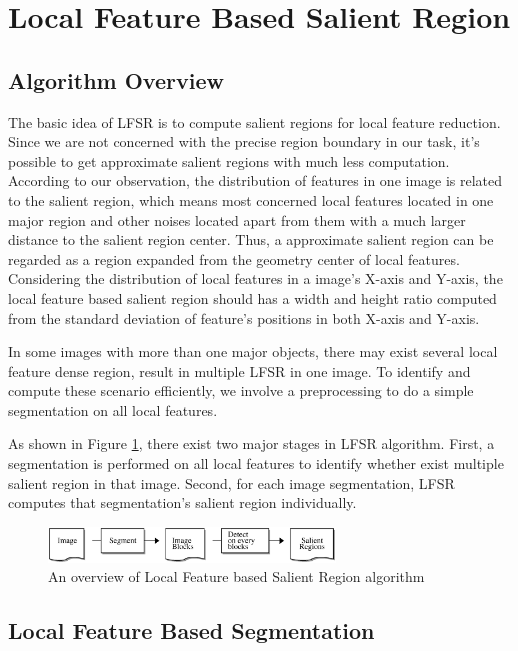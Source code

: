 \section{Local Feature Based Salient Region}
\label{sec:algorithm}

\subsection{Algorithm Overview}
\label{sec:algorithm_overview}

The basic idea of LFSR is to compute salient regions for local feature reduction. Since we are not concerned with the precise region boundary in our task, it's possible to get approximate salient regions with much less computation. According to our observation, the distribution of features in one image is related to the salient region, which means most concerned local features located in one major region and other noises located apart from them with a much larger distance to the salient region center. Thus, a approximate salient region can be regarded as a region expanded from the geometry center of local features. Considering the distribution of local features in a image's X-axis and Y-axis, the local feature based salient region should has a width and height ratio computed from the standard deviation of feature's positions in both X-axis and Y-axis.

In some images with more than one major objects, there may exist several local feature dense region, result in multiple LFSR in one image. To identify and compute these scenario efficiently, we involve a preprocessing to do a simple segmentation on all local features. 

As shown in Figure \ref{fig:overview}, there exist two major stages in LFSR algorithm. First, a segmentation is performed on all local features to identify whether exist multiple salient region in that image. Second, for each image segmentation, LFSR computes that segmentation's salient region individually.

\begin{figure}
\centering
\label{fig:overview}
\includegraphics[width=3.0in]{images/fig-overview.eps}
\caption{An overview of Local Feature based Salient Region algorithm}
\end{figure}

\subsection{Local Feature Based Segmentation}
\label{sec:algorithm_segmentation}

